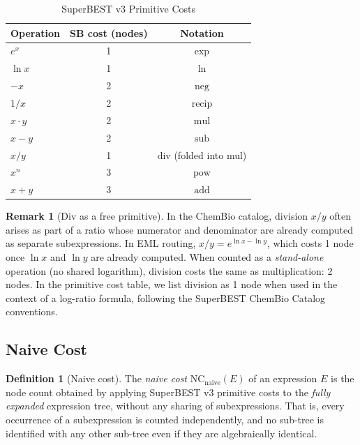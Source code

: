 \documentclass[12pt,a4paper]{article}
\theoremstyle{definition}
\newtheorem{definition}[theorem]{Definition}
\newtheorem{remark}[theorem]{Remark}
\newcommand{\NC}{\mathrm{NC}}
\begin{document}
\begin{table}[ht]
\centering
\caption{SuperBEST v3 Primitive Costs}
\label{tab:primitives}
\begin{tabular}{lcc}
\toprule
\textbf{Operation} & \textbf{SB cost (nodes)} & \textbf{Notation} \\
\midrule
$e^x$              & 1 & $\exp$ \\
$\ln x$            & 1 & $\ln$ \\
$-x$               & 2 & $\mathrm{neg}$ \\
$1/x$              & 2 & $\mathrm{recip}$ \\
$x \cdot y$        & 2 & $\mathrm{mul}$ \\
$x - y$            & 2 & $\mathrm{sub}$ \\
$x / y$            & 1 & $\mathrm{div}$ (folded into mul) \\
$x^n$              & 3 & $\mathrm{pow}$ \\
$x + y$            & 3 & $\mathrm{add}$ \\
\bottomrule
\end{tabular}
\end{table}

\begin{remark}[Div as a free primitive]
In the ChemBio catalog, division $x/y$ often arises as part of a ratio
whose numerator and denominator are already computed as separate
subexpressions.  In EML routing, $x/y = e^{\ln x - \ln y}$, which costs
1 node once $\ln x$ and $\ln y$ are already computed.  When counted
as a \emph{stand-alone} operation (no shared logarithm), division costs
the same as multiplication: 2 nodes.  In the primitive cost table, we
list division as 1 node when used in the context of a log-ratio formula,
following the SuperBEST ChemBio Catalog conventions.
\end{remark}

\subsection{Naive Cost}

\begin{definition}[Naive cost]\label{def:naive}
The \emph{naive cost} $\NC_{\mathrm{naive}}(E)$ of an expression $E$ is the
node count obtained by applying SuperBEST v3 primitive costs to the
\emph{fully expanded} expression tree, without any sharing of subexpressions.
That is, every occurrence of a subexpression is counted independently, and no
sub-tree is identified with any other sub-tree even if they are algebraically
identical.
\end{definition}
\end{document}
